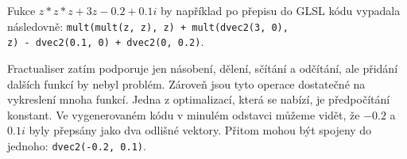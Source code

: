 Fukce $z*z*z + 3z - 0.2 + 0.1i$ by například po přepisu do GLSL kódu vypadala
následovně:
\texttt{mult(mult(z, z), z) + mult(dvec2(3, 0), \\z) - dvec2(0.1, 0) + dvec2(0, 0.2)}.

Fractualiser zatím podporuje jen násobení, dělení, sčítání a odčítání, ale
přidání dalších funkcí by nebyl problém. Zároveň jsou tyto operace dostatečné
na vykreslení mnoha funkcí. Jedna z optimalizací, která se nabízí, je předpočítání
konstant. Ve vygenerovaném kódu v minulém odstavci můžeme vidět, že $-0.2$ a $0.1i$
byly přepsány jako dva odlišné vektory. Přitom mohou být spojeny do jednoho:
\texttt{dvec2(-0.2, 0.1)}.
